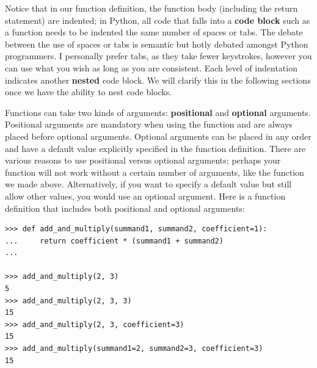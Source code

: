\documentclass[a4paper,11pt]{article}
\begin{document}
Notice that in our function definition, the function body (including the return statement) are indented; in 
Python, all code that falls into a \textbf{code block} such as a function needs to be indented the same number
of spaces or tabs.  The debate between the use of spaces or tabs is semantic but hotly debated amongst Python 
programmers.  I personally prefer tabs, as they take fewer keystrokes, however you can use what you wish as 
long as you are consistent.  Each level of indentation indicates another \textbf{nested} code block.  We 
will clarify this in the following sections once we have the ability to nest code blocks.  \par
Functions can take two kinds of arguments: \textbf{positional} and \textbf{optional} arguments.  Positional 
arguments are mandatory when using the function and are always placed before optional arguments.  Optional
arguments can be placed in any order and have a default value explicitly specified in the function definition.  
There are various reasons to use positional versus optional arguments; perhaps your function will not work 
without a certain number of arguments, like the function we made above.  Alternatively, if you want to specify 
a default value but still allow other values, you would use an optional argument.  Here is a function definition 
that includes both positional and optional arguments:

\vspace{3mm}
\begin{lstlisting}
>>> def add_and_multiply(summand1, summand2, coefficient=1):
...     return coefficient * (summand1 + summand2)
... 

>>> add_and_multiply(2, 3)
5
>>> add_and_multiply(2, 3, 3)
15
>>> add_and_multiply(2, 3, coefficient=3)
15
>>> add_and_multiply(summand1=2, summand2=3, coefficient=3)
15
\end{lstlisting}
\vspace{3mm}
\end{document}
